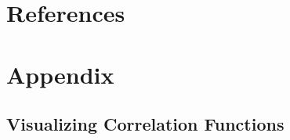 \documentclass[%
 reprint,
 amsmath,amssymb,
 aps,nofootinbib
]{revtex4-1}
\begin{document}

\onecolumngrid

\section{References}
\vspace{-.2825in}





\newpage

\section{Appendix}

\subsection{Visualizing Correlation Functions}
\end{document}
